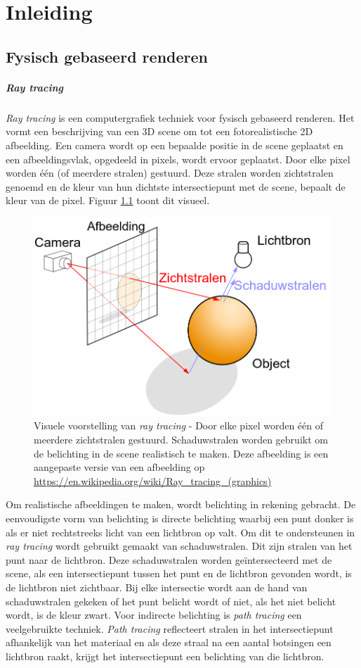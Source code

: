 \chapter{Inleiding}
\label{hoofdstuk:inleiding}

\section{Fysisch gebaseerd renderen}
\paragraph{Ray tracing}
\textit{Ray tracing} is een computergrafiek techniek voor fysisch gebaseerd renderen. Het vormt een beschrijving van een 3D scene om tot een fotorealistische 2D afbeelding. Een camera wordt op een bepaalde positie in de scene geplaatst en een afbeeldingsvlak, opgedeeld in pixels, wordt ervoor geplaatst. Door elke pixel worden één (of meerdere stralen) gestuurd. Deze stralen worden zichtstralen genoemd en de kleur van hun dichtste intersectiepunt met de scene, bepaalt de kleur van de pixel. Figuur \ref{fig:raytracing} toont dit visueel.\\

\begin{figure}
    \centering
    \includegraphics[width=0.5\linewidth]{img/ray-tracing}
    \caption[Visuele voorstelling van \textit{ray tracing}]%
{Visuele voorstelling van \textit{ray tracing} - \small Door elke pixel worden één of meerdere zichtstralen gestuurd. Schaduwstralen worden gebruikt om de belichting in de scene realistisch te maken. Deze afbeelding is een aangepaste versie van een afbeelding op \url{https://en.wikipedia.org/wiki/Ray_tracing_(graphics)}}
    \label{fig:raytracing}    
\end{figure}

Om realistische afbeeldingen te maken, wordt belichting in rekening gebracht. De eenvoudigste vorm van belichting is directe belichting waarbij een punt donker is als er niet rechtstreeks licht van een lichtbron op valt. Om dit te ondersteunen in \textit{ray tracing} wordt gebruikt gemaakt van schaduwstralen. Dit zijn stralen van het punt naar de lichtbron.  Deze schaduwstralen worden geïntersecteerd met de scene, als een intersectiepunt tussen het punt en de lichtbron gevonden wordt, is de lichtbron niet zichtbaar.  Bij elke intersectie wordt aan de hand van schaduwstralen gekeken of het punt belicht wordt of niet, als het niet belicht wordt, is de kleur zwart. Voor indirecte belichting is \textit{path tracing} een veelgebruikte techniek. \textit{Path tracing} reflecteert stralen in het intersectiepunt afhankelijk van het materiaal en als deze straal na een aantal botsingen een lichtbron raakt, krijgt het intersectiepunt een belichting van die lichtbron.    

